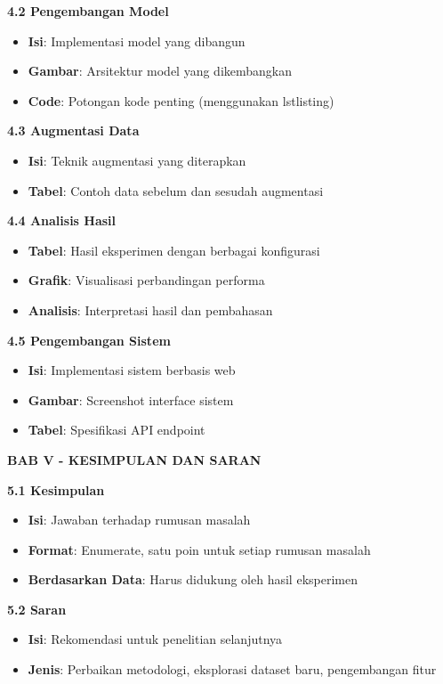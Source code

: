 \textbf{4.2 Pengembangan Model}
\begin{itemize}
    \item \textbf{Isi}: Implementasi model yang dibangun
    \item \textbf{Gambar}: Arsitektur model yang dikembangkan
    \item \textbf{Code}: Potongan kode penting (menggunakan lstlisting)
\end{itemize}

\textbf{4.3 Augmentasi Data}
\begin{itemize}
    \item \textbf{Isi}: Teknik augmentasi yang diterapkan
    \item \textbf{Tabel}: Contoh data sebelum dan sesudah augmentasi
\end{itemize}

\textbf{4.4 Analisis Hasil}
\begin{itemize}
    \item \textbf{Tabel}: Hasil eksperimen dengan berbagai konfigurasi
    \item \textbf{Grafik}: Visualisasi perbandingan performa
    \item \textbf{Analisis}: Interpretasi hasil dan pembahasan
\end{itemize}

\textbf{4.5 Pengembangan Sistem}
\begin{itemize}
    \item \textbf{Isi}: Implementasi sistem berbasis web
    \item \textbf{Gambar}: Screenshot interface sistem
    \item \textbf{Tabel}: Spesifikasi API endpoint
\end{itemize}

\textbf{BAB V - KESIMPULAN DAN SARAN}

\textbf{5.1 Kesimpulan}
\begin{itemize}
    \item \textbf{Isi}: Jawaban terhadap rumusan masalah
    \item \textbf{Format}: Enumerate, satu poin untuk setiap rumusan masalah
    \item \textbf{Berdasarkan Data}: Harus didukung oleh hasil eksperimen
\end{itemize}

\textbf{5.2 Saran}
\begin{itemize}
    \item \textbf{Isi}: Rekomendasi untuk penelitian selanjutnya
    \item \textbf{Jenis}: Perbaikan metodologi, eksplorasi dataset baru, pengembangan fitur
\end{itemize}

